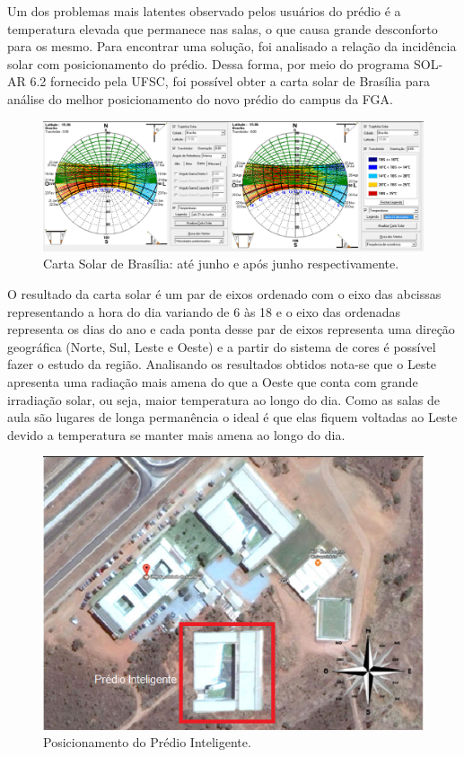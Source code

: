 Um dos problemas mais latentes observado pelos usuários do prédio é a temperatura elevada que permanece nas salas, o que causa grande desconforto para os mesmo. Para encontrar uma solução, foi analisado a relação da incidência solar com posicionamento do prédio. Dessa forma, por meio do programa SOL-AR 6.2 fornecido pela UFSC, foi possível obter a carta solar de Brasília para análise do melhor posicionamento do novo prédio do campus da FGA.

\begin{figure}[!h]
  \centering
  \includegraphics[keepaspectratio=true,scale=0.3]{figuras/carta_solar.eps}
  \caption{Carta Solar de Brasília: até junho e após junho respectivamente.}
  \label{fig:carta_solar}
\end{figure}

O resultado da carta solar é um par de eixos ordenado com o eixo das abcissas representando a hora do dia variando de 6 às 18 e o eixo das ordenadas representa os dias do ano e cada ponta desse par de eixos representa uma direção geográfica (Norte, Sul, Leste e Oeste) e a partir do sistema de cores é possível fazer o estudo da região. Analisando os resultados obtidos nota-se que o Leste apresenta uma radiação mais amena do que a Oeste que conta com grande irradiação solar, ou seja, maior temperatura ao longo do dia. Como as salas de aula são lugares de longa permanência o ideal é que elas fiquem voltadas ao Leste devido a temperatura se manter mais amena ao longo do dia.

\begin{figure}[!h]
  \centering
  \includegraphics[keepaspectratio=true,scale=0.45]{figuras/posicao.eps}
  \caption{Posicionamento do Prédio Inteligente.}
  \label{fig:posicao}
\end{figure}

